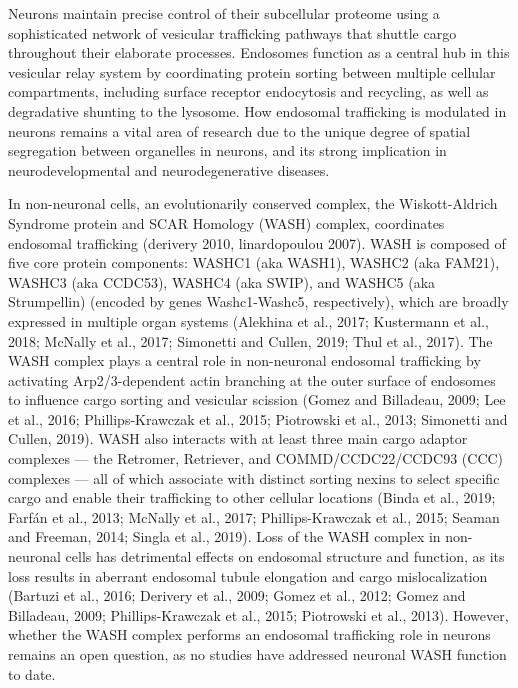 
Neurons maintain precise control of their subcellular proteome using a 
sophisticated network of vesicular trafficking pathways that shuttle cargo 
throughout their elaborate processes. Endosomes function as a central hub in 
this vesicular relay system by coordinating protein sorting between multiple 
cellular compartments, including surface receptor endocytosis and recycling, 
as well as degradative shunting to the lysosome. 
How endosomal trafficking is modulated in neurons remains a vital area of 
research due to the unique degree of spatial segregation between organelles 
in neurons, and its strong implication in neurodevelopmental and 
neurodegenerative diseases.  

In non-neuronal cells, an evolutionarily conserved complex, the Wiskott-Aldrich
Syndrome protein and SCAR Homology (WASH) complex, coordinates endosomal
trafficking (derivery 2010, linardopoulou 2007). WASH is
composed of five core protein components: WASHC1 (aka WASH1), WASHC2 (aka
FAM21), WASHC3 (aka CCDC53), WASHC4 (aka SWIP), and WASHC5 (aka Strumpellin)
(encoded by genes Washc1-Washc5, respectively), which are broadly expressed in
multiple organ systems (Alekhina et al., 2017; Kustermann et al., 2018; McNally
et al., 2017; Simonetti and Cullen, 2019; Thul et al., 2017).  The WASH complex
plays a central role in non-neuronal endosomal trafficking by activating
Arp2/3-dependent actin branching at the outer surface of endosomes to influence
cargo sorting and vesicular scission (Gomez and Billadeau, 2009; Lee et al.,
2016; Phillips-Krawczak et al., 2015; Piotrowski et al., 2013; Simonetti and
Cullen, 2019). WASH also interacts with at least three main cargo adaptor
complexes — the Retromer, Retriever, and COMMD/CCDC22/CCDC93 (CCC) complexes —
all of which associate with distinct sorting nexins to select specific cargo and
enable their trafficking to other cellular locations (Binda et al., 2019; Farfán
et al., 2013; McNally et al., 2017; Phillips-Krawczak et al., 2015; Seaman and
Freeman, 2014; Singla et al., 2019). Loss of the WASH complex in non-neuronal
cells has detrimental effects on endosomal structure and function, as its loss
results in aberrant endosomal tubule elongation and cargo mislocalization
(Bartuzi et al., 2016; Derivery et al., 2009; Gomez et al., 2012; Gomez and
Billadeau, 2009; Phillips-Krawczak et al., 2015; Piotrowski et al., 2013).
However, whether the WASH complex performs an endosomal trafficking role in
neurons remains an open question, as no studies have addressed neuronal WASH
function to date. 

